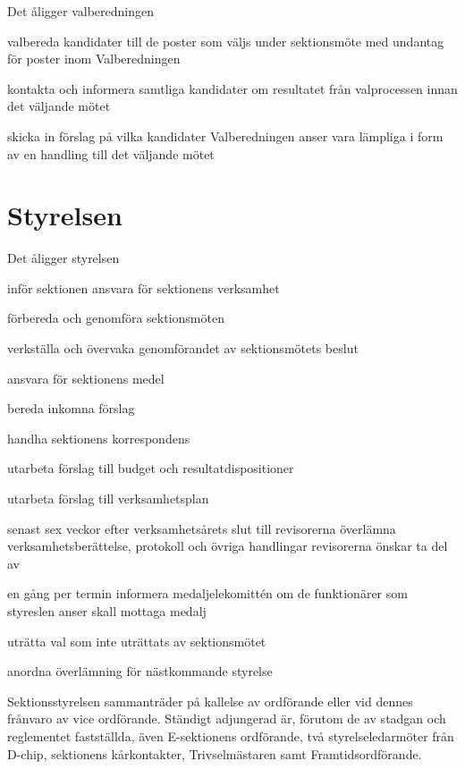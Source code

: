 \documentclass[pdfbookmarks,a4paper,11pt]{article}
\newlength{\itemcollength}
\newenvironment{reglemlista}{%
  \begin{list}{}{%
      \setlength{\labelwidth}{\itemcollength}%
      \setlength{\leftmargin}{\labelwidth + \labelsep}%
      \renewcommand{\makelabel}[1]{%
        \raisebox{0pt}[1ex][0pt]{%
          \makebox[\labelwidth][l]{%
            \parbox[t]{\itemcollength}{%
              \raggedright\hspace{0pt}##1}}}\hfill}%
      }}{%
  \end{list}}
\begin{document}
\begin{reglemlista}

	\item[Åligganden]
	Det åligger valberedningen
	\begin{attlista}
		\item valbereda kandidater till de poster som väljs under sektionsmöte med undantag för poster inom Valberedningen
		\item kontakta och informera samtliga kandidater om resultatet från valprocessen innan det
		väljande mötet
		\item skicka in förslag på vilka kandidater Valberedningen anser vara lämpliga i form av en
		handling till det väljande mötet
	\end{attlista}

\end{reglemlista}

\section{Styrelsen}

\begin{reglemlista}

	\item[Åligganden]
	Det åligger styrelsen
	\begin{attlista}
		\item inför sektionen ansvara för sektionens verksamhet
		\item förbereda och genomföra sektionsmöten
		\item verkställa och övervaka genomförandet av sektionsmötets beslut
		\item ansvara för sektionens medel
		\item bereda inkomna förslag
		\item handha sektionens korrespondens
		\item utarbeta förslag till budget och resultatdispositioner
		\item utarbeta förslag till verksamhetsplan
		\item senast sex veckor efter verksamhetsårets slut till revisor\-erna överlämna verksamhetsberättelse, protokoll och övriga handlingar revisorerna önskar ta del av
		\item en gång per termin informera medaljelekomittén om de funktionärer som styreslen anser skall mottaga medalj
		\item uträtta val som inte uträttats av sektionsmötet
		\item anordna överlämning för nästkommande styrelse
	\end{attlista}

	\item[Sammanträde]
	Sektionsstyrelsen sammanträder på kallelse av ordförande eller vid dennes frånvaro av vice ordförande. Ständigt adjungerad är, förutom de av stadgan och reglementet fastställda, även E-sektionens
	ordförande, två styrelseledarmöter från D-chip, sektionens kårkontakter, Trivselmästaren
	samt Framtidsordförande.

\end{reglemlista}
\end{document}
